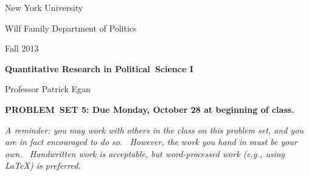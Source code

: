 \documentclass[11pt]{article}
\begin{document}
New York University

Wilf Family Department of Politics

Fall 2013

\begin{center}
{\large \textbf{Quantitative Research in Political\ Science I}}

Professor Patrick Egan

\bigskip

\textbf{PROBLEM\ SET 5: Due Monday, October 28 at beginning of class.}
\end{center}

\textit{A reminder: you may work with others in the class on this problem
set, and you are in fact encouraged to do so. \ However, the work you hand
in must be your own. \ Handwritten work is acceptable, but word-processed
work (e.g., using LaTeX) is preferred.}

\bigskip
\end{document}
